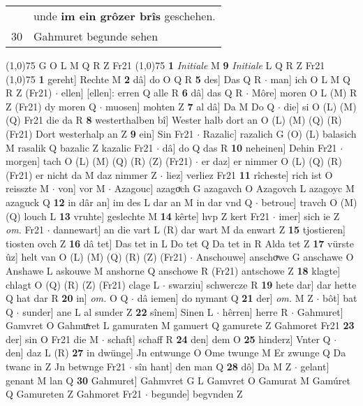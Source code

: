 \documentclass[8pt,a4paper,notitlepage]{article}
\begin{document}
\begin{table}[ht]
\begin{minipage}[t]{0.5\linewidth}
\begin{tabular}{rl}
 & unde \textbf{im ein grôzer brîs} geschehen.\\ 
30 & Gahmuret begunde sehen\\ 
\end{tabular}
\scriptsize
\line(1,0){75} \newline
G O L M Q R Z Fr21 \newline
\line(1,0){75} \newline
\textbf{1} \textit{Initiale} M  \textbf{9} \textit{Initiale} L Q R Z Fr21  \newline
\line(1,0){75} \newline
\textbf{1} gereht] Rechte M \textbf{2} dâ] do O Q R \textbf{5} des] Das Q R  $\cdot$ man] ich O L M Q R Z (Fr21)  $\cdot$ ellen] [ellen]: erren Q alle R \textbf{6} dâ] das Q R  $\cdot$ Môre] moren O L (M) R Z (Fr21) dy moren Q  $\cdot$ muosen] mohten Z \textbf{7} al dâ] Da M Do Q  $\cdot$ die] si O (L) (M) (Q) Fr21 die da R \textbf{8} westerthalben bî] Wester halb dort an O (L) (M) (Q) (R) (Fr21) Dort westerhalp an Z \textbf{9} ein] Sin Fr21  $\cdot$ Razalic] razalich G (O) (L) balasich M rasalik Q bazalic Z kazalic Fr21  $\cdot$ dâ] do Q das R \textbf{10} neheinen] Dehin Fr21  $\cdot$ morgen] tach O (L) (M) (Q) (R) (Z) (Fr21)  $\cdot$ er daz] er nimmer O (L) (Q) (R) (Fr21) er nicht da M daz nimmer Z  $\cdot$ liez] verliez Fr21 \textbf{11} rîcheste] rich ist O reisszte M  $\cdot$ von] vor M  $\cdot$ Azagouc] azagoͮch G azagavch O Azagovch L azagoyc M azaguck Q \textbf{12} in dâr an] im des L dar an M in dar vnd Q  $\cdot$ betrouc] travch O (M) (Q) louch L \textbf{13} vruhte] geslechte M \textbf{14} kêrte] hvp Z kert Fr21  $\cdot$ imer] sich ie Z \textit{om.} Fr21  $\cdot$ dannewart] an die vart L (R) dar wart M da enwart Z \textbf{15} tjostieren] tiosten ovch Z \textbf{16} dâ tet] Das tet in L Do tet Q Da tet in R Alda tet Z \textbf{17} vürste ûz] helt van O (L) (M) (Q) (R) (Z) (Fr21)  $\cdot$ Anschouwe] anschoͮwe G anschawe O Anshawe L askouwe M anshorne Q anschowe R (Fr21) antschowe Z \textbf{18} klagte] chlagt O (Q) (R) (Z) (Fr21) clage L  $\cdot$ swarziu] schwercze R \textbf{19} hete dar] dar hette Q hat dar R \textbf{20} in] \textit{om.} O Q  $\cdot$ dâ iemen] do nymant Q \textbf{21} der] \textit{om.} M Z  $\cdot$ bôt] bat Q  $\cdot$ sunder] ane L al sunder Z \textbf{22} sînem] Sinen L  $\cdot$ hêrren] herre R  $\cdot$ Gahmuret] Gamvret O Gahmuͯret L gamuraten M gamuert Q gamurete Z Gahmoret Fr21 \textbf{23} der] sin O Fr21 die M  $\cdot$ schaft] schaff R \textbf{24} den] dem O \textbf{25} hinderz] Vnter Q  $\cdot$ den] daz L (R) \textbf{27} in dwünge] Jn entwunge O Ome twunge M Er zwunge Q Da twanc in Z Jn betwnge Fr21  $\cdot$ sîn hant] den man Q \textbf{28} dô] Da M Z  $\cdot$ gelant] genant M lan Q \textbf{30} Gahmuret] Gahmvret G L Gamvret O Gamurat M Gamúret Q Gamureten Z Gahmoret Fr21  $\cdot$ begunde] begvnden Z \newline

\end{minipage}
\end{table}
\end{document}
